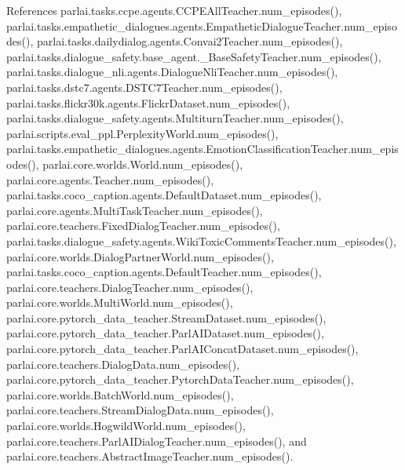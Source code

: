References parlai.\+tasks.\+ccpe.\+agents.\+C\+C\+P\+E\+All\+Teacher.\+num\+\_\+episodes(), parlai.\+tasks.\+empathetic\+\_\+dialogues.\+agents.\+Empathetic\+Dialogue\+Teacher.\+num\+\_\+episodes(), parlai.\+tasks.\+dailydialog.\+agents.\+Convai2\+Teacher.\+num\+\_\+episodes(), parlai.\+tasks.\+dialogue\+\_\+safety.\+base\+\_\+agent.\+\_\+\+Base\+Safety\+Teacher.\+num\+\_\+episodes(), parlai.\+tasks.\+dialogue\+\_\+nli.\+agents.\+Dialogue\+Nli\+Teacher.\+num\+\_\+episodes(), parlai.\+tasks.\+dstc7.\+agents.\+D\+S\+T\+C7\+Teacher.\+num\+\_\+episodes(), parlai.\+tasks.\+flickr30k.\+agents.\+Flickr\+Dataset.\+num\+\_\+episodes(), parlai.\+tasks.\+dialogue\+\_\+safety.\+agents.\+Multiturn\+Teacher.\+num\+\_\+episodes(), parlai.\+scripts.\+eval\+\_\+ppl.\+Perplexity\+World.\+num\+\_\+episodes(), parlai.\+tasks.\+empathetic\+\_\+dialogues.\+agents.\+Emotion\+Classification\+Teacher.\+num\+\_\+episodes(), parlai.\+core.\+worlds.\+World.\+num\+\_\+episodes(), parlai.\+core.\+agents.\+Teacher.\+num\+\_\+episodes(), parlai.\+tasks.\+coco\+\_\+caption.\+agents.\+Default\+Dataset.\+num\+\_\+episodes(), parlai.\+core.\+agents.\+Multi\+Task\+Teacher.\+num\+\_\+episodes(), parlai.\+core.\+teachers.\+Fixed\+Dialog\+Teacher.\+num\+\_\+episodes(), parlai.\+tasks.\+dialogue\+\_\+safety.\+agents.\+Wiki\+Toxic\+Comments\+Teacher.\+num\+\_\+episodes(), parlai.\+core.\+worlds.\+Dialog\+Partner\+World.\+num\+\_\+episodes(), parlai.\+tasks.\+coco\+\_\+caption.\+agents.\+Default\+Teacher.\+num\+\_\+episodes(), parlai.\+core.\+teachers.\+Dialog\+Teacher.\+num\+\_\+episodes(), parlai.\+core.\+worlds.\+Multi\+World.\+num\+\_\+episodes(), parlai.\+core.\+pytorch\+\_\+data\+\_\+teacher.\+Stream\+Dataset.\+num\+\_\+episodes(), parlai.\+core.\+pytorch\+\_\+data\+\_\+teacher.\+Parl\+A\+I\+Dataset.\+num\+\_\+episodes(), parlai.\+core.\+pytorch\+\_\+data\+\_\+teacher.\+Parl\+A\+I\+Concat\+Dataset.\+num\+\_\+episodes(), parlai.\+core.\+teachers.\+Dialog\+Data.\+num\+\_\+episodes(), parlai.\+core.\+pytorch\+\_\+data\+\_\+teacher.\+Pytorch\+Data\+Teacher.\+num\+\_\+episodes(), parlai.\+core.\+worlds.\+Batch\+World.\+num\+\_\+episodes(), parlai.\+core.\+teachers.\+Stream\+Dialog\+Data.\+num\+\_\+episodes(), parlai.\+core.\+worlds.\+Hogwild\+World.\+num\+\_\+episodes(), parlai.\+core.\+teachers.\+Parl\+A\+I\+Dialog\+Teacher.\+num\+\_\+episodes(), and parlai.\+core.\+teachers.\+Abstract\+Image\+Teacher.\+num\+\_\+episodes().

